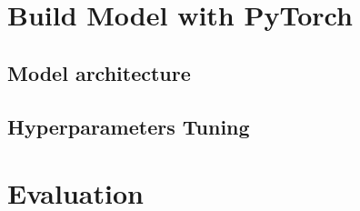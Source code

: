 \documentclass[12pt,twoside]{report}
\begin{document}
\section{Build Model with PyTorch}
\subsection{Model architecture}
\subsection{Hyperparameters Tuning}

\section{Evaluation}








\end{document}
